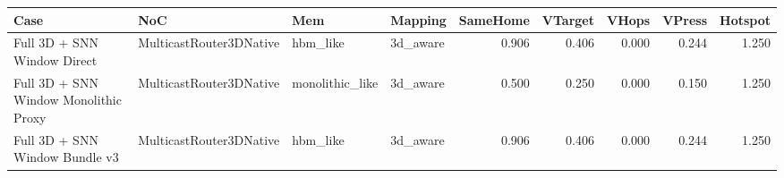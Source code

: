 \begin{tabular}{l l l l r r r r r}
\hline
Case & NoC & Mem & Mapping & SameHome & VTarget & VHops & VPress & Hotspot \\
\hline
Full 3D + SNN Window Direct & MulticastRouter3DNative & hbm\_like & 3d\_aware & 0.906 & 0.406 & 0.000 & 0.244 & 1.250 \\
Full 3D + SNN Window Monolithic Proxy & MulticastRouter3DNative & monolithic\_like & 3d\_aware & 0.500 & 0.250 & 0.000 & 0.150 & 1.250 \\
Full 3D + SNN Window Bundle v3 & MulticastRouter3DNative & hbm\_like & 3d\_aware & 0.906 & 0.406 & 0.000 & 0.244 & 1.250 \\
\hline
\end{tabular}

